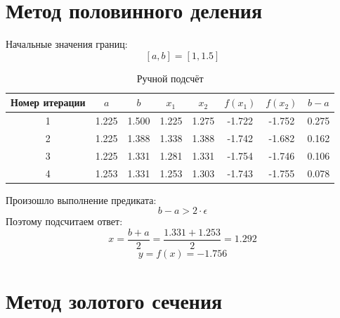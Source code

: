 \documentclass{article}
\begin{document}
\section{Метод половинного деления}
Начальные значения границ:
\[[a, b] = [1, 1.5]\]
\begin{table}[ht]
    \centering
    \begin{tabular}{|c|c|c|c|c|c|c|c|}
        \hline
        Номер итерации & $a$    & $b$    & $x_1$    & $x_2$    & $f(x_1)$         & $f(x_2)$         & $b-a$   \\ \hline
        1              & 1.225  & 1.500  & 1.225    & 1.275    & -1.722           & -1.752           & 0.275   \\
        2              & 1.225  & 1.388  & 1.338    & 1.388    & -1.742           & -1.682           & 0.162   \\
        3              & 1.225  & 1.331  & 1.281    & 1.331    & -1.754           & -1.746           & 0.106   \\
        4              & 1.253  & 1.331  & 1.253    & 1.303    & -1.743           & -1.755           & 0.078   \\ \hline
        \end{tabular}
    \caption{Ручной подсчёт}
    \label{your-label}
\end{table}
Произошло выполнение предиката: 
\[b - a > 2\cdot \epsilon\]
Поэтому подсчитаем ответ: 
\[x = \frac{b+a}{2} = \frac{1.331+1.253}{2} = 1.292\]
\[y = f(x) = -1.756\]

\section{Метод золотого сечения}
\end{document}
